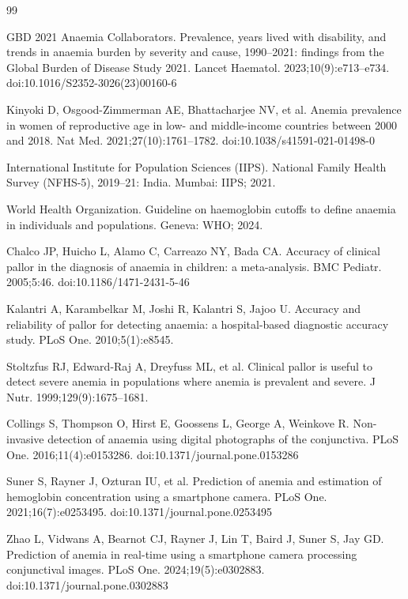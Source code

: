 \documentclass[10pt,a4paper,twocolumn]{article}
\begin{document}
\begin{thebibliography}{99}
\footnotesize
\setlength{\itemsep}{1pt}

 GBD 2021 Anaemia Collaborators. Prevalence, years lived with disability, and trends in anaemia burden by severity and cause, 1990--2021: findings from the Global Burden of Disease Study 2021. Lancet Haematol. 2023;10(9):e713--e734. doi:10.1016/S2352-3026(23)00160-6

 Kinyoki D, Osgood-Zimmerman AE, Bhattacharjee NV, et al. Anemia prevalence in women of reproductive age in low- and middle-income countries between 2000 and 2018. Nat Med. 2021;27(10):1761--1782. doi:10.1038/s41591-021-01498-0

 International Institute for Population Sciences (IIPS). National Family Health Survey (NFHS-5), 2019--21: India. Mumbai: IIPS; 2021.

 World Health Organization. Guideline on haemoglobin cutoffs to define anaemia in individuals and populations. Geneva: WHO; 2024.

 Chalco JP, Huicho L, Alamo C, Carreazo NY, Bada CA. Accuracy of clinical pallor in the diagnosis of anaemia in children: a meta-analysis. BMC Pediatr. 2005;5:46. doi:10.1186/1471-2431-5-46

 Kalantri A, Karambelkar M, Joshi R, Kalantri S, Jajoo U. Accuracy and reliability of pallor for detecting anaemia: a hospital-based diagnostic accuracy study. PLoS One. 2010;5(1):e8545.

 Stoltzfus RJ, Edward-Raj A, Dreyfuss ML, et al. Clinical pallor is useful to detect severe anemia in populations where anemia is prevalent and severe. J Nutr. 1999;129(9):1675--1681.

 Collings S, Thompson O, Hirst E, Goossens L, George A, Weinkove R. Non-invasive detection of anaemia using digital photographs of the conjunctiva. PLoS One. 2016;11(4):e0153286. doi:10.1371/journal.pone.0153286

 Suner S, Rayner J, Ozturan IU, et al. Prediction of anemia and estimation of hemoglobin concentration using a smartphone camera. PLoS One. 2021;16(7):e0253495. doi:10.1371/journal.pone.0253495

 Zhao L, Vidwans A, Bearnot CJ, Rayner J, Lin T, Baird J, Suner S, Jay GD. Prediction of anemia in real-time using a smartphone camera processing conjunctival images. PLoS One. 2024;19(5):e0302883. doi:10.1371/journal.pone.0302883


\end{thebibliography}
\end{document}
